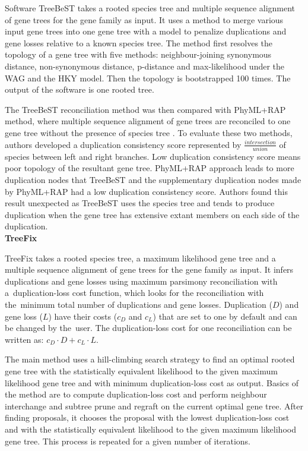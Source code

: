 Software TreeBeST \cite{treebest_online} takes a rooted species tree and multiple sequence alignment of gene trees for the gene family as input. It uses a method to merge various input gene trees into one gene tree with a model to penalize duplications and gene losses relative to a known species tree. The method first resolves the topology of a gene tree with five methods: neighbour-joining synonymous distance, non-synonymous distance, p-distance and max-likelihood under the WAG and the HKY model. Then the topology is bootstrapped 100 times. The output of the software is one rooted tree.

The TreeBeST reconciliation method was then compared with PhyML+RAP method, where multiple sequence alignment of gene trees are reconciled to one gene tree without the presence of species tree \cite{treebest}. To evaluate these two methods, authors developed a duplication consistency score represented by \( \frac{intersection}{union} \) of species between left and right branches. Low duplication consistency score means poor topology of the resultant gene tree. PhyML+RAP approach leads to more duplication nodes that TreeBeST and the supplementary duplication nodes made by PhyML+RAP had a low duplication consistency score. Authors found this result unexpected as TreeBeST uses the species tree and tends to produce duplication when the gene tree has extensive extant members on each side of the duplication.\\
\textbf{TreeFix}  

TreeFix \cite{treefix_tutorial} takes a rooted species tree, a maximum likelihood gene tree and a multiple sequence alignment of gene trees for the gene family as input. It infers duplications and gene losses using maximum parsimony reconciliation with a~duplication-loss cost function, which looks for the reconciliation with the~minimum total number of duplications and gene losses. Duplication ($D$) and gene loss ($L$) have their costs ($c_D$ and $c_L$) that are set to one by default and can be changed by the~user. The duplication-loss cost for one reconciliation can be written as: $c_D \cdot D+c_L \cdot L$. 

The main method \cite{treefix} uses a hill-climbing search strategy to find an optimal rooted gene tree with the statistically equivalent likelihood to the given maximum likelihood gene tree and with minimum duplication-loss cost as output. Basics of the method are to compute duplication-loss cost and perform neighbour interchange and subtree prune and regraft on the current optimal gene tree. After finding proposals, it chooses the proposal with the lowest duplication-loss cost and with the statistically equivalent likelihood to the given maximum likelihood gene tree. This process is repeated for a given number of iterations.

